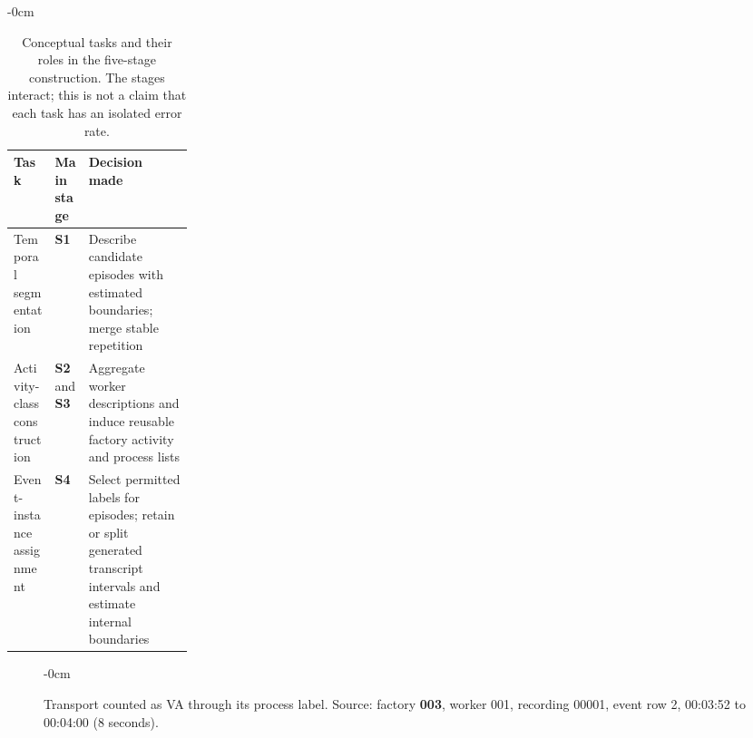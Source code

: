 \begin{nextpagetopfloat}
\begin{table}[!t]\begin{adjustwidth}{-\extralength}{0cm}
\caption{Conceptual tasks and their roles in the five-stage construction. The stages interact; this is not a claim that each task has an isolated error rate.}
\label{tab:abstraction}\footnotesize
\begin{tabularx}{\linewidth}{@{}>{\raggedright\arraybackslash}p{0.23\linewidth}lL@{}}\toprule
Task & Main stage & Decision made \\\midrule
Temporal segmentation & \textbf{S1} & Describe candidate episodes with estimated boundaries; merge stable repetition \\
Activity-class construction & \textbf{S2} and \textbf{S3} & Aggregate worker descriptions and induce reusable factory activity and process lists \\
Event-instance assignment & \textbf{S4} & Select permitted labels for episodes; retain or split generated transcript intervals and estimate internal boundaries \\
\bottomrule\end{tabularx}
\end{adjustwidth}\end{table}
\end{nextpagetopfloat}

\begin{figure}[!b]\begin{adjustwidth}{-\extralength}{0cm}\centering
{}
\caption{Transport counted as VA through its process label. Source: factory \textbf{003}, worker 001, recording 00001, event row 2, 00:03:52 to 00:04:00 (8 seconds).}
\label{fig:category}\end{adjustwidth}\end{figure}

